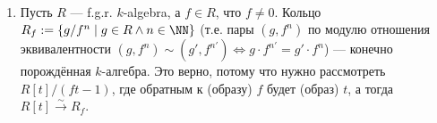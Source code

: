 \documentclass[12pt,a4paper]{article}
\begin{document}
    \begin{example}[нетривиальные]\ 
        \begin{enumerate}
            \item Пусть $R$ --- f.g.r. $k$-algebra, а $f \in R$, что $f \neq 0$. Кольцо $R_f := \{g/f^n \mid g \in R \wedge n \in \NN\}$ (т.е. пары $(g, f^n)$ по модулю отношения эквивалентности $(g, f^n) \sim (g', f^{n'}) \Leftrightarrow g \cdot f^{n'} = g' \cdot f^n$) --- конечно порождённая $k$-алгебра. Это верно, потому что нужно рассмотреть $R[t]/(ft - 1)$, где обратным к (образу) $f$ будет (образ) $t$, а тогда $R[t] \overset{\sim}{\to} R_f$.
        \end{enumerate}
    \end{example}
\end{document}
